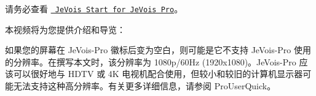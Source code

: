 请务必查看 \href{http://jevois.org/start/startPro.html}{\texttt{ Je\+Vois Start for Je\+Vois Pro}}。

本视频将为您提供介绍和导览：



如果您的屏幕在 Je\+Vois-\/\+Pro 徽标后变为空白，则可能是它不支持 Je\+Vois-\/\+Pro 使用的分辨率。在撰写本文时，该分辨率为 1080p/60\+Hz (1920x1080)。\+Je\+Vois-\/\+Pro 应该可以很好地与 H\+D\+TV 或 4K 电视机配合使用，但较小和较旧的计算机显示器可能无法支持这种高分辨率。有关更多详细信息，请参阅 Pro\+User\+Quick。 